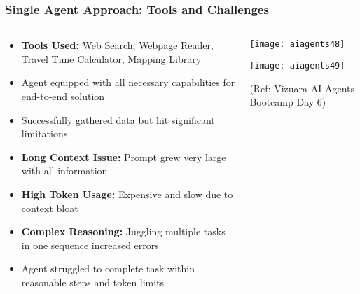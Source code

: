 \begin{frame}[fragile]\frametitle{Single Agent Approach: Tools and Challenges}
\begin{columns}
    \begin{column}[T]{0.6\linewidth}
      \begin{itemize}
		\item \textbf{Tools Used:} Web Search, Webpage Reader, Travel Time Calculator, Mapping Library
		\item Agent equipped with all necessary capabilities for end-to-end solution
		\item Successfully gathered data but hit significant limitations
		\item \textbf{Long Context Issue:} Prompt grew very large with all information
		\item \textbf{High Token Usage:} Expensive and slow due to context bloat
		\item \textbf{Complex Reasoning:} Juggling multiple tasks in one sequence increased errors
		\item Agent struggled to complete task within reasonable steps and token limits
	  \end{itemize}
    \end{column}
    \begin{column}[T]{0.4\linewidth}
		\begin{center}
		\texttt{[image: aiagents48]}
		
		\texttt{[image: aiagents49]}
		
		{\tiny (Ref: Vizuara AI Agents Bootcamp Day 6)}
		\end{center}	
    \end{column}
  \end{columns}
\end{frame}

